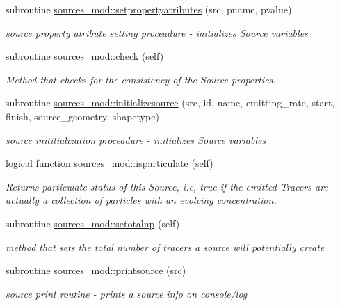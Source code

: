 \begin{DoxyCompactItemize}
subroutine \mbox{\hyperlink{namespacesources__mod_abbb4557b46c533439fe258cecf31a76c}{sources\+\_\+mod\+::setpropertyatributes}} (src, pname, pvalue)
\begin{DoxyCompactList}\small\item\em source property atribute setting proceadure -\/ initializes Source variables \end{DoxyCompactList}\item 
subroutine \mbox{\hyperlink{namespacesources__mod_a6fcfcb690cd1b9375915b01f7ddbe801}{sources\+\_\+mod\+::check}} (self)
\begin{DoxyCompactList}\small\item\em Method that checks for the consistency of the Source properties. \end{DoxyCompactList}\item 
subroutine \mbox{\hyperlink{namespacesources__mod_a6dcf7a3e3ccf75e01853df166231d484}{sources\+\_\+mod\+::initializesource}} (src, id, name, emitting\+\_\+rate, start, finish, source\+\_\+geometry, shapetype)
\begin{DoxyCompactList}\small\item\em source inititialization proceadure -\/ initializes Source variables \end{DoxyCompactList}\item 
logical function \mbox{\hyperlink{namespacesources__mod_ac4e4f33da78d030e1b56a48789da6a05}{sources\+\_\+mod\+::isparticulate}} (self)
\begin{DoxyCompactList}\small\item\em Returns particulate status of this Source, i.\+e, true if the emitted Tracers are actually a collection of particles with an evolving concentration. \end{DoxyCompactList}\item 
subroutine \mbox{\hyperlink{namespacesources__mod_a9a62c41b71d2d6ad85def74087542ef5}{sources\+\_\+mod\+::setotalnp}} (self)
\begin{DoxyCompactList}\small\item\em method that sets the total number of tracers a source will potentially create \end{DoxyCompactList}\item 
subroutine \mbox{\hyperlink{namespacesources__mod_a641fe9ecc295e486a714c1aaa133d991}{sources\+\_\+mod\+::printsource}} (src)
\begin{DoxyCompactList}\small\item\em source print routine -\/ prints a source info on console/log \end{DoxyCompactList}\end{DoxyCompactItemize}
